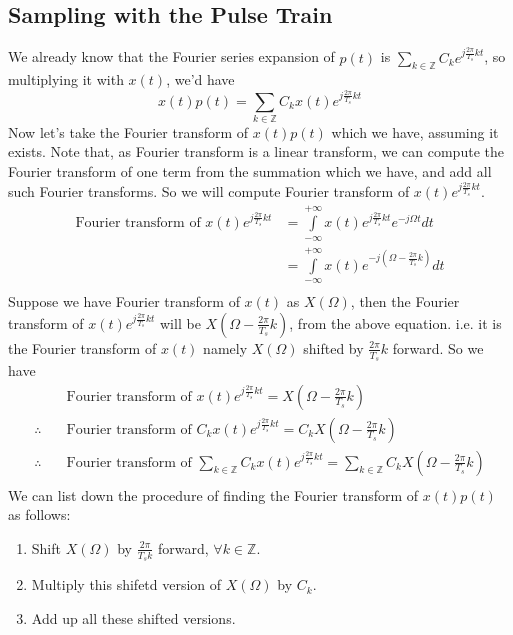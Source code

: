 \subsection{Sampling with the Pulse Train}
We already know that the Fourier series expansion of $p(t)$ is $\sum\limits_{k\in\mathbb{Z}}C_{k}e^{j\frac{2\pi}{T_{s}}kt}$, so multiplying it with $x(t)$, we'd have 
\begin{equation}
x(t)p(t)=\sum\limits_{k\in\mathbb{Z}}C_{k}x(t)e^{j\frac{2\pi}{T_{s}}kt}\nonumber
\end{equation}
Now let's take the Fourier transform of $x(t)p(t)$ which we have, assuming it exists. Note that, as Fourier transform is a linear transform, we can compute the Fourier transform of one term from the summation which we have, and add all such Fourier transforms. So we will compute Fourier transform of $x(t)e^{j\frac{2\pi}{T_{s}}kt}$.
\begin{align*}
\text{Fourier transform of }x(t)e^{j\frac{2\pi}{T_{s}}kt}&=\int\limits_{-\infty}^{+\infty}x(t)e^{j\frac{2\pi}{T_{s}}kt}e^{-j\Omega t}dt\\
&=\int\limits_{-\infty}^{+\infty}x(t)e^{-j\left(\Omega-\frac{2\pi}{T_{s}}k\right)}dt\\
\end{align*}
Suppose we have Fourier transform of $x(t)$ as $X(\Omega)$, then the Fourier transform of $x(t)e^{j\frac{2\pi}{T_{s}}kt}$ will be $X\left(\Omega-\frac{2\pi}{T_{s}}k\right)$, from the above equation. i.e. it is the Fourier transform of $x(t)$ namely $X(\Omega)$ shifted by $\frac{2\pi}{T_{s}}k$ forward. So we have 
\begin{align*}
&\text{Fourier transform of }x(t)e^{j\frac{2\pi}{T_{s}}kt}=X\left(\Omega-\frac{2\pi}{T_{s}}k\right)\\
\therefore\quad &\text{Fourier transform of }C_{k}x(t)e^{j\frac{2\pi}{T_{s}}kt}=C_{k}X\left(\Omega-\frac{2\pi}{T_{s}}k\right)\\
\therefore \quad&\text{Fourier transform of }\sum\limits_{k\in\mathbb{Z}}C_{k}x(t)e^{j\frac{2\pi}{T_{s}}kt}=\sum\limits_{k\in\mathbb{Z}}C_{k}X\left(\Omega-\frac{2\pi}{T_{s}}k\right)\\
\end{align*}
We can list down the procedure of finding the Fourier transform of $x(t)p(t)$ as follows:
\begin{enumerate}
\item Shift $X(\Omega)$ by $\frac{2\pi}{T_{s}k}$ forward, $\forall k\in\mathbb{Z}$.
\item Multiply this shifetd version of $X(\Omega)$ by $C_{k}$.
\item Add up all these shifted versions.
\end{enumerate}
